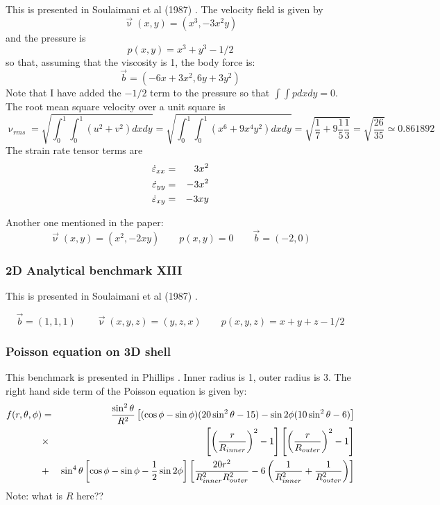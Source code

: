 This is presented in Soulaimani et al (1987) \cite{sofo87}. 
The velocity field is given by
\[
\vec\upnu(x,y) = (x^3,-3x^2y) 
\]
and the pressure is 
\[
p(x,y)=x^3+y^3-1/2
\]
so that, assuming that the viscosity is 1, the body force is:
\[
\vec{b} = (-6x+3x^2,6y+3y^2)
\] 
Note that I have added the $-1/2$ term to the pressure so that $\int\int p dxdy=0$.
The root mean square velocity over a unit square is 
\[
\upnu_{rms} 
= \sqrt{ \int_0^1\int_0^1 (u^2+v^2) dx dy }
= \sqrt{ \int_0^1\int_0^1 (x^6 + 9 x^4 y^2) dx dy }
= \sqrt{ \frac{1}{7} + 9 \frac{1}{5} \frac{1}{3}  } 
= \sqrt{ \frac{26}{35} }
\simeq 0.861892 
\]
The strain rate tensor terms are
\begin{eqnarray}
\dot{\varepsilon}_{xx} &=& 3x^2  \nonumber\\
\dot{\varepsilon}_{yy} &=& -3x^2 \nonumber\\ 
\dot{\varepsilon}_{xy} &=& -3xy  \nonumber
\end{eqnarray}

Another one mentioned in the paper:
\[
\vec\upnu(x,y) =(x^2,-2xy)
\qquad
p(x,y)=0
\qquad
\vec{b}=(-2,0) 
\]

\subsubsection{2D Analytical benchmark XIII}\label{ss:sofo87_3D}

This is presented in Soulaimani et al (1987) \cite{sofo87}. 

\[
\vec{b} = (1,1,1)
\qquad
\vec{\upnu}(x,y,z)=(y,z,x)
\qquad
p(x,y,z)=x+y+z-1/2
\]


\subsubsection{Poisson equation on 3D shell} 

This benchmark is presented in Phillips \etal \cite{phdo19}. 
Inner radius is 1, outer radius is 3.
The right hand side term of the Poisson equation is given by:
\begin{eqnarray}
f(r,\theta,\phi)&=&
\frac{\sin^2\theta }{R^2} 
\left[
(\cos\phi-\sin\phi)(20\sin^2\theta -15) -\sin 2\phi (10\sin^2 \theta -6)
\right] \nonumber\\
&\times & \left[ \left(\frac{r}{R_{inner}}\right)^2 -1  \right]
\left[ \left(\frac{r}{R_{outer}}\right)^2 -1  \right] \nonumber\\
&+&\sin^4 \theta
\left[ \cos\phi -\sin\phi -\frac12 \sin 2\phi \right]
\left[
\frac{20r^2}{R_{inner}^2R_{outer}^2} -6 \left( \frac{1}{R_{inner}^2}+\frac{1}{R_{outer}^2}  \right)
\right]
\end{eqnarray}
Note: what is $R$ here??

